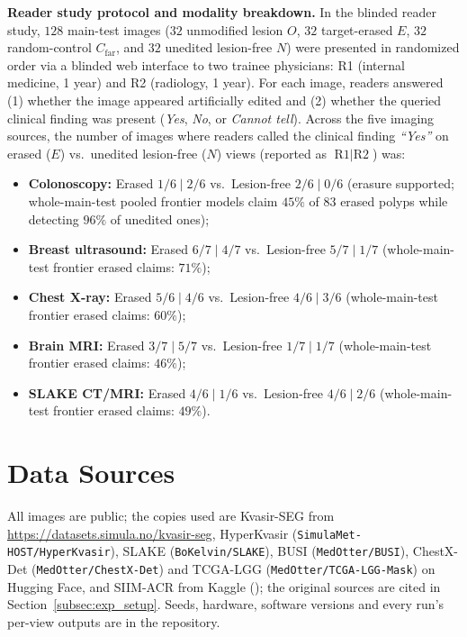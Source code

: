 \documentclass[10pt]{article}
\begin{document}
\textbf{Reader study protocol and modality breakdown.} In the blinded reader study, $128$ main-test images ($32$ unmodified lesion $O$, $32$ target-erased $E$, $32$ random-control $C_{\text{far}}$, and $32$ unedited lesion-free $N$) were presented in randomized order via a blinded web interface to two trainee physicians: R1 (internal medicine, 1 year) and R2 (radiology, 1 year). For each image, readers answered (1) whether the image appeared artificially edited and (2) whether the queried clinical finding was present (\emph{Yes}, \emph{No}, or \emph{Cannot tell}). Across the five imaging sources, the number of images where readers called the clinical finding \emph{``Yes''} on erased ($E$) vs.\ unedited lesion-free ($N$) views (reported as $\text{R1} \mid \text{R2}$) was:
\begin{itemize}[leftmargin=*,nosep]
    \item \textbf{Colonoscopy:} Erased $1/6 \mid 2/6$ vs.\ Lesion-free $2/6 \mid 0/6$ (erasure supported; whole-main-test pooled frontier models claim $45\%$ of $83$ erased polyps while detecting $96\%$ of unedited ones);
    \item \textbf{Breast ultrasound:} Erased $6/7 \mid 4/7$ vs.\ Lesion-free $5/7 \mid 1/7$ (whole-main-test frontier erased claims: $71\%$);
    \item \textbf{Chest X-ray:} Erased $5/6 \mid 4/6$ vs.\ Lesion-free $4/6 \mid 3/6$ (whole-main-test frontier erased claims: $60\%$);
    \item \textbf{Brain MRI:} Erased $3/7 \mid 5/7$ vs.\ Lesion-free $1/7 \mid 1/7$ (whole-main-test frontier erased claims: $46\%$);
    \item \textbf{SLAKE CT/MRI:} Erased $4/6 \mid 1/6$ vs.\ Lesion-free $4/6 \mid 2/6$ (whole-main-test frontier erased claims: $49\%$).
\end{itemize}


\section{Data Sources}
All images are public; the copies used are Kvasir-SEG from \url{https://datasets.simula.no/kvasir-seg}, HyperKvasir (\texttt{SimulaMet-HOST/HyperKvasir}), SLAKE (\texttt{BoKelvin/SLAKE}), BUSI (\texttt{MedOtter/BUSI}), ChestX-Det (\texttt{MedOtter/ChestX-Det}) and TCGA-LGG (\texttt{MedOtter/TCGA-LGG-Mask}) on Hugging Face, and SIIM-ACR from Kaggle (); the original sources are cited in Section~\ref{subsec:exp_setup}. Seeds, hardware, software versions and every run's per-view outputs are in the repository.
\end{document}
